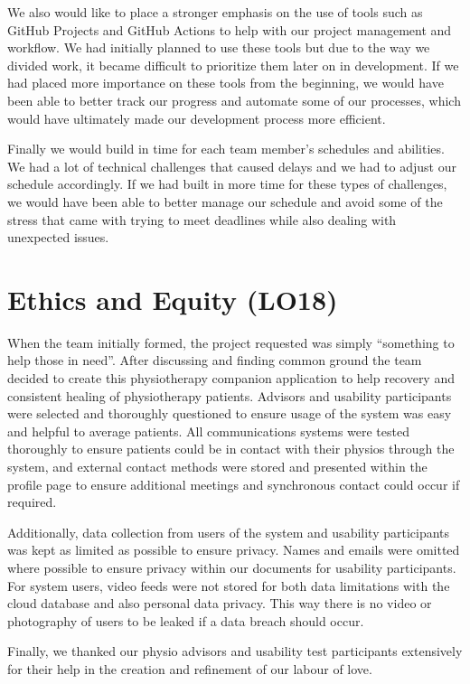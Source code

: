 \documentclass{article}
\begin{document}
We also would like to place a stronger emphasis on the use of tools such as GitHub Projects and GitHub Actions to help with our project management and workflow. We had initially planned to use these tools but due to the way we divided work, it became difficult to prioritize them later on in development. If we had placed more importance on these tools from the beginning, we would have been able to better track our progress and automate some of our processes, which would have ultimately made our development process more efficient.

Finally we would build in time for each team member's schedules and abilities. We had a lot of technical challenges that caused delays and we had to adjust our schedule accordingly. If we had built in more time for these types of challenges, we would have been able to better manage our schedule and avoid some of the stress that came with trying to meet deadlines while also dealing with unexpected issues.

\section{Ethics and Equity (LO18)}

When the team initially formed, the project requested was simply “something to help those in need”. After discussing and finding common ground the team decided to create this physiotherapy companion application to help recovery and consistent healing of physiotherapy patients. Advisors and usability participants were selected and thoroughly questioned to ensure usage of the system was easy and helpful to average patients. All communications systems were tested thoroughly to ensure patients could be in contact with their physios through the system, and external contact methods were stored and presented within the profile page to ensure additional meetings and synchronous contact could occur if required.

Additionally, data collection from users of the system and usability participants was kept as limited as possible to ensure privacy. Names and emails were omitted where possible to ensure privacy within our documents for usability participants. For system users, video feeds were not stored for both data limitations with the cloud database and also personal data privacy. This way there is no video or photography of users to be leaked if a data breach should occur.

Finally, we thanked our physio advisors and usability test participants extensively for their help in the creation and refinement of our labour of love.
\end{document}
